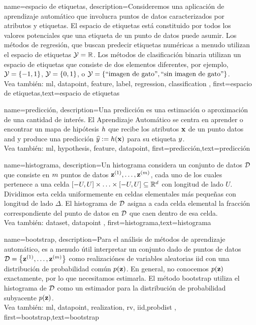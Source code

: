 {name={espacio de etiquetas},
	description={Consideremos una aplicación de aprendizaje automático que involucra puntos de datos caracterizados por atributos
		y etiquetas. El espacio de etiquetas está constituido por todos los valores potenciales que una etiqueta
		de un punto de datos puede asumir. Los métodos de regresión, que buscan predecir etiquetas numéricas 
		a menudo utilizan el espacio de etiquetas $\mathcal{Y} = \mathbb{R}$. Los métodos de clasificación binaria utilizan un espacio de etiquetas  
		que consiste de dos elementos diferentes, por ejemplo, $\mathcal{Y} =\{-1,1\}$, $\mathcal{Y}=\{0,1\}$, 
		o $\mathcal{Y} = \{ \mbox{``imagen de gato''}, \mbox{``sin imagen de gato''} \}$.
		\\
		Vea también: \gls{ml}, \gls{datapoint},  \gls{feature}, \gls{label}, \Gls{regression}, \gls{classification} }, 
		first={espacio de etiquetas},text={espacio de etiquetas}  
}

{name={predicción},
	description={Una  predicción es una estimación o aproximación de una cantidad de interés.  
		El Aprendizaje Automático se centra en aprender o encontrar un mapa de hipótesis $h$ 
		que recibe los atributos ${\bf x}$ de un punto datos and y produce una predicción
		$\widehat{y} := h({\bf x})$ para su etiqueta $y$. 
		\\
		Vea también:  \Gls{ml}, \gls{hypothesis}, \gls{feature}, \gls{datapoint}},
	first={predicción},text={predicción}  
}

{name={histograma},
	description={Un histograma  considera un conjunto de datos $\mathcal{D}$ que consiste en $m$ puntos de datos
		${\bf z}^{(1)},\ldots,{\bf z}^{(m)}$, cada uno de los cuales pertenece a una celda  
		$[-U,U] \times \ldots \times [-U,U] \subseteq \mathbb{R}^{d}$ con longitud de lado 
		$U$. Dividimos esta celda uniformemente en celdas elementales más pequeñas con longitud de lado 
		$\Delta$. El histograma de $\mathcal{D}$ asigna a cada celda elemental la fracción correspondiente del
		punto de datos en $\mathcal{D}$ que caen dentro de esa celda.
		\\
		Vea también: \gls{dataset}, \gls{datapoint} },
	first={histograma},text={histograma}  
}

{name={bootstrap},
	description={Para el análisis de métodos de aprendizaje automático, es a menudo útil interpretar 
		un conjunto dado de puntos de datos $\mathcal{D} = \big\{ {\bf z}^{(1)},\ldots,{\bf z}^{(m)}\big\}$ 
		como realizaciónes de variables aleatorias iid con una distribución de probabilidad común $p({\bf z})$. En general, no conocemos 
		$p({\bf z})$ exactamente, por lo que necesitamos estimarla. El método bootstrap utiliza el histograma de 
		$\mathcal{D}$ como un estimador para la distribución de probabilidad subyacente $p({\bf z})$. 
		\\
		Vea también: \gls{ml}, \gls{datapoint}, \gls{realization}, \gls{rv}, \gls{iid},\gls{probdist} },
	first={bootstrap},text={bootstrap}  
}

